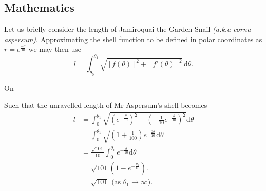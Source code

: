 \documentclass[twoside]{article}
\begin{document}
\begin{multicols}{2}
    \begin{flushleft}
    \begin{minipage}{0.5\textwidth}
    \section*{Mathematics}

        Let us briefly consider the length of Jamiroquai the Garden Snail \emph{(a.k.a cornu aspersum)}.
        Approximating the shell function to be defined in polar coordinates as \(r = e^{\frac{-\theta}{10}}\) we may then use \[ l = \int^{\theta_1}_{\theta_0} \sqrt{[f(\theta)]^2 + [f'(\theta)]^2} \, \mathrm{d}\theta .\]

        On

        \begin{center}
        \end{center}

        Such that the unravelled length of Mr Aspersum's shell becomes 
        \begin{align*}
            l &= \int^{\theta_1}_{0} \sqrt{(e^{-\frac{\theta}{10}})^2 + (-\frac{1}{10}e^{-\frac{\theta}{10}})^2}\mathrm{d}\theta\\
            &= \int^{\theta_1}_{0} \sqrt{(1+\frac{1}{100})e^{-\frac{2\theta}{10}}} \mathrm{d}\theta\\
            &= \frac{\sqrt{101}}{10} \int^{\theta_1}_0 e^{-\frac{\theta}{10}}\mathrm{d}\theta\\
            &= \sqrt{101}(1 - e^{-\frac{\theta_1}{10}}).\\
            &= \sqrt{101} \text{ (as \(\theta_1 \rightarrow \infty\)).}
        \end{align*}

    \end{minipage}
    \end{flushleft}

\end{multicols}
\end{document}
